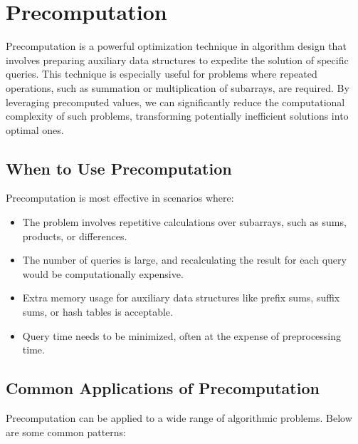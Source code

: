 \section{Precomputation}
\label{sec:Precomputation}

Precomputation is a powerful optimization technique in algorithm design that involves preparing auxiliary data structures to expedite the solution of specific queries. This technique is especially useful for problems where repeated operations, such as summation or multiplication of subarrays, are required. By leveraging precomputed values, we can significantly reduce the computational complexity of such problems, transforming potentially inefficient solutions into optimal ones.

\subsection*{When to Use Precomputation}
Precomputation is most effective in scenarios where:

\begin{itemize}
    \item The problem involves repetitive calculations over subarrays, such as sums, products, or differences.
    \item The number of queries is large, and recalculating the result for each query would be computationally expensive.
    \item Extra memory usage for auxiliary data structures like prefix sums, suffix sums, or hash tables is acceptable.
    \item Query time needs to be minimized, often at the expense of preprocessing time.
\end{itemize}

\subsection*{Common Applications of Precomputation}

Precomputation can be applied to a wide range of algorithmic problems. Below are some common patterns:

